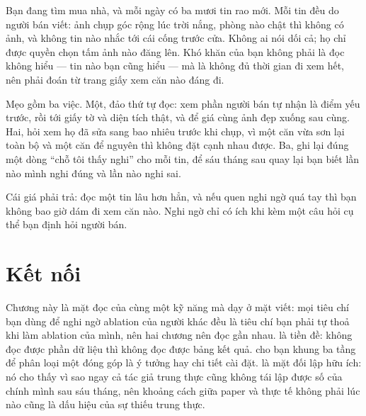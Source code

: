 \documentclass[../../deep_learning.tex]{subfiles}
\begin{document}
\begin{dongian}
Bạn đang tìm mua nhà, và mỗi ngày có ba mươi tin rao mới. Mỗi tin đều do người bán viết: ảnh chụp góc rộng lúc trời nắng, phòng nào chật thì không có ảnh, và không tin nào nhắc tới cái cống trước cửa. Không ai nói dối cả; họ chỉ được quyền chọn tấm ảnh nào đăng lên. Khó khăn của bạn không phải là đọc không hiểu --- tin nào bạn cũng hiểu --- mà là không đủ thời gian đi xem hết, nên phải đoán từ trang giấy xem căn nào đáng đi.

Mẹo gồm ba việc. Một, đảo thứ tự đọc: xem phần người bán tự nhận là điểm yếu trước, rồi tới giấy tờ và diện tích thật, và để giá cùng ảnh đẹp xuống sau cùng. Hai, hỏi xem họ đã sửa sang bao nhiêu trước khi chụp, vì một căn vừa sơn lại toàn bộ và một căn để nguyên thì không đặt cạnh nhau được. Ba, ghi lại đúng một dòng ``chỗ tôi thấy nghi'' cho mỗi tin, để sáu tháng sau quay lại bạn biết lần nào mình nghi đúng và lần nào nghi sai.

Cái giá phải trả: đọc một tin lâu hơn hẳn, và nếu quen nghi ngờ quá tay thì bạn không bao giờ dám đi xem căn nào. Nghi ngờ chỉ có ích khi kèm một câu hỏi cụ thể bạn định hỏi người bán.

\end{dongian}

\section{Kết nối}
Chương này là mặt đọc của cùng một kỹ năng mà  dạy ở mặt viết: mọi tiêu chí bạn dùng để nghi ngờ ablation của người khác đều là tiêu chí bạn phải tự thoả khi làm ablation của mình, nên hai chương nên đọc gần nhau.  là tiền đề: không đọc được phần dữ liệu thì không đọc được bảng kết quả.  cho bạn khung ba tầng để phân loại một đóng góp là ý tưởng hay chi tiết cài đặt.  là mặt đối lập hữu ích: nó cho thấy vì sao ngay cả tác giả trung thực cũng không tái lập được số của chính mình sau sáu tháng, nên khoảng cách giữa paper và thực tế không phải lúc nào cũng là dấu hiệu của sự thiếu trung thực.
\end{document}
